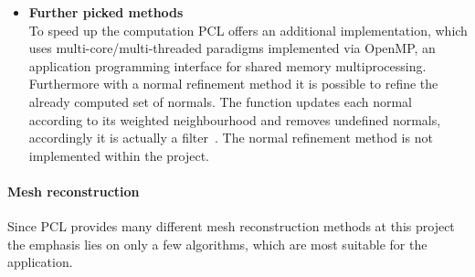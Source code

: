 \documentclass[paper=a4,11pt,bibliography=totoc]{scrartcl}
\begin{document}
\begin{itemize}
%
\item \textbf{Further picked methods}\\
To speed up the computation PCL offers an additional implementation, which uses multi-core/multi-threaded paradigms implemented via OpenMP, an application programming interface for shared memory multiprocessing. Furthermore with a normal refinement method it is possible to refine the already computed set of normals. The function updates each normal according to its weighted neighbourhood and removes undefined normals, accordingly it is actually a filter~\cite{pcldoc}. The normal refinement method is not implemented within the project.
%
\end{itemize}
%
\paragraph*{Mesh reconstruction}
%
Since PCL provides many different mesh reconstruction methods at this project the emphasis lies on only a few algorithms, which are most suitable for the application.
%
\end{document}
